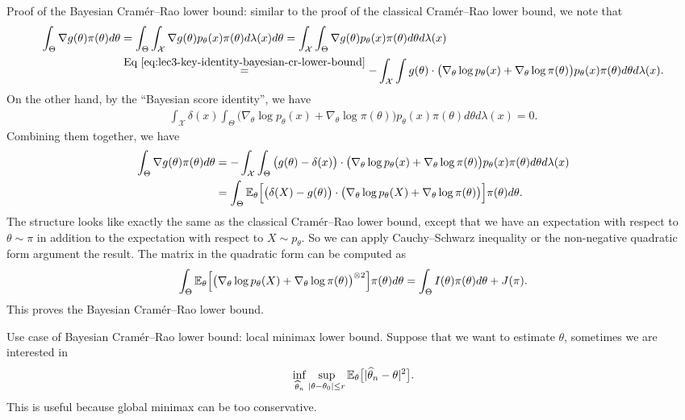 \documentclass[11pt,letterpaper]{article}
\numberwithin{theorem}{lecture}
\numberwithin{proposition}{lecture}
\numberwithin{lemma}{lecture}
\numberwithin{claim}{lecture}
\numberwithin{corollary}{lecture}
\numberwithin{definition}{lecture}
\numberwithin{conjecture}{lecture}
\numberwithin{remark}{lecture}
\numberwithin{example}{lecture}
\numberwithin{equation}{lecture}
\begin{document}
Proof of the Bayesian Cram\'{e}r--Rao lower bound: similar to the proof of the classical Cram\'{e}r--Rao lower bound, we note that
\begin{align*}
  \int_\Theta \nabla g (\theta) \pi (\theta) d\theta &= \int_\Theta \int_{\mathcal{X}} \nabla g (\theta) p_\theta (x) \pi (\theta) d\lambda(x) d\theta = \int_{\mathcal{X}} \int_\Theta  \nabla g (\theta) p_\theta (x) \pi (\theta) d\theta d\lambda(x) \\
  &\overset{\mbox{Eq~\eqref{eq:lec3-key-identity-bayesian-cr-lower-bound}}}{=} - \int_{\mathcal{X}}  \int g(\theta) \cdot \big(\nabla_\theta \log p_\theta (x) + \nabla_\theta \log \pi (\theta) \big) p_\theta (x) \pi (\theta) d\theta d\lambda(x).
\end{align*}
On the other hand, by the ``Bayesian score identity'', we have
\begin{align*}
  \int_{\mathcal{X}} \delta (x) \int_\Theta \big(\nabla_\theta \log p_\theta (x) + \nabla_\theta \log \pi (\theta) \big) p_\theta (x) \pi (\theta) d\theta d\lambda(x) = 0.
\end{align*}
Combining them together, we have
\begin{align*}
\int_\Theta \nabla g (\theta) \pi (\theta) d\theta &= - \int_{\mathcal{X}}  \int_\Theta \big( g(\theta) - \delta (x) \big) \cdot \big(\nabla_\theta \log p_\theta (x) + \nabla_\theta \log \pi (\theta) \big) p_\theta (x) \pi (\theta) d\theta d\lambda(x)\\
&= \int_\Theta {\mathbb{E}}_\theta \Big[ \big( \delta (X) - g (\theta) \big) \cdot\big(\nabla_\theta \log p_\theta (X) + \nabla_\theta \log \pi (\theta) \big) \Big] \pi (\theta) d \theta.
\end{align*}
The structure looks like exactly the same as the classical Cram\'{e}r--Rao lower bound, except that we have an expectation with respect to $\theta \sim \pi$ in addition to the expectation with respect to $X \sim p_\theta$. So we can apply Cauchy--Schwarz inequality or the non-negative quadratic form argument the result. The matrix in the quadratic form can be computed as
\begin{align*}
  \int_\Theta {\mathbb{E}}_\theta \Big[ \big(\nabla_\theta \log p_\theta (X) + \nabla_\theta \log \pi (\theta) \big)^{\otimes 2} \Big] \pi (\theta) d \theta = \int_\Theta I(\theta) \pi (\theta) d\theta + J (\pi).
\end{align*}
This proves the Bayesian Cram\'{e}r--Rao lower bound.

Use case of Bayesian Cram\'{e}r--Rao lower bound: local minimax lower bound. Suppose that we want to estimate $\theta$, sometimes we are interested in
\begin{align*}
  \inf_{\widehat{\theta}_n} \sup_{ |\theta - \theta_0| \leq r} {\mathbb{E}}_\theta \big[ |\widehat{\theta}_n - \theta|^2 \big].
\end{align*}
This is useful because global minimax can be too conservative.
\end{document}
